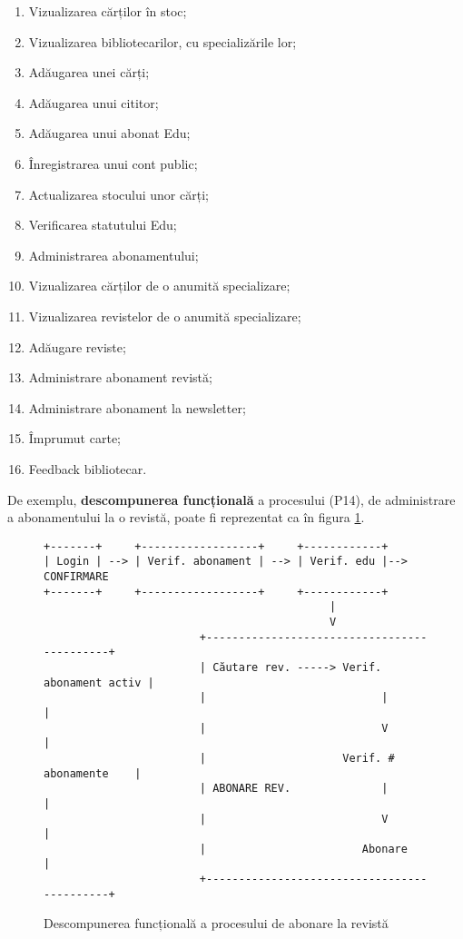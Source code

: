 \begin{enumerate}[(P1)]
    \item Vizualizarea cărților în stoc;
    \item Vizualizarea bibliotecarilor, cu specializările lor;
    \item Adăugarea unei cărți;
    \item Adăugarea unui cititor;
    \item Adăugarea unui abonat Edu;
    \item Înregistrarea unui cont public;
    \item Actualizarea stocului unor cărți;
    \item Verificarea statutului Edu;
    \item Administrarea abonamentului;
    \item Vizualizarea cărților de o anumită specializare;
    \item Vizualizarea revistelor de o anumită specializare;
    \item Adăugare reviste;
    \item Administrare abonament revistă;
    \item Administrare abonament la newsletter;
    \item Împrumut carte;
    \item Feedback bibliotecar.
\end{enumerate}

De exemplu, \textbf{descompunerea funcțională} a procesului (P14),
de administrare a abonamentului la o revistă, poate fi reprezentat ca în
figura \ref{fig:proc-abonare-rev}.
\begin{figure}[!htbp]
    \small
    \begin{verbatim}
+-------+     +------------------+     +------------+
| Login | --> | Verif. abonament | --> | Verif. edu |--> CONFIRMARE
+-------+     +------------------+     +------------+
                                            |
                                            V
                        +--------------------------------------------+
                        | Căutare rev. -----> Verif. abonament activ |
                        |                           |                |
                        |                           V                |
                        |                     Verif. # abonamente    |
                        | ABONARE REV.              |                |
                        |                           V                |
                        |                        Abonare             |
                        +--------------------------------------------+
    \end{verbatim}
    \caption{Descompunerea funcțională a procesului de abonare la revistă}
    \label{fig:proc-abonare-rev}
\end{figure}


